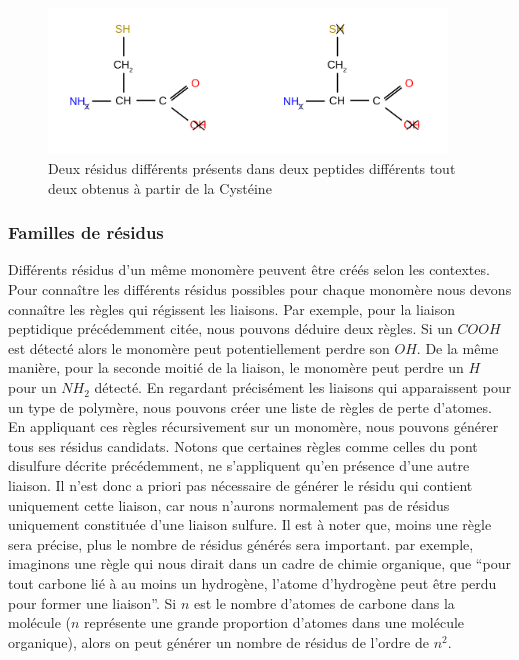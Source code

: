 \begin{figure}[!ht]
  \begin{center}
    \includegraphics[width=400px]{Figures/s2m/residues/cys_exemple.png}
    \caption{\label{cys_ex}Deux résidus différents présents dans deux peptides différents tout deux obtenus à partir de la Cystéine}
  \end{center}
\end{figure}


\subsubsection{Familles de résidus}

Différents résidus d'un même monomère peuvent être créés selon les contextes.
Pour connaître les différents résidus possibles pour chaque monomère nous devons connaître les règles qui régissent les liaisons.
Par exemple, pour la liaison peptidique précédemment citée, nous pouvons déduire deux règles.
Si un $COOH$ est détecté alors le monomère peut potentiellement perdre son $OH$.
De la même manière, pour la seconde moitié de la liaison, le monomère peut perdre un $H$ pour un $NH_2$ détecté.
En regardant précisément les liaisons qui apparaissent pour un type de polymère, nous pouvons créer une liste de règles de perte d'atomes.
En appliquant ces règles récursivement sur un monomère, nous pouvons générer tous ses résidus candidats.
Notons que certaines règles comme celles du pont disulfure décrite précédemment, ne s'appliquent qu'en présence d'une autre liaison.
Il n'est donc a priori pas nécessaire de générer le résidu qui contient uniquement cette liaison, car nous n'aurons normalement pas de résidus uniquement constituée d'une liaison sulfure.
Il est à noter que, moins une règle sera précise, plus le nombre de résidus générés sera important.
par exemple, imaginons une règle qui nous dirait dans un cadre de chimie organique, que ``pour tout carbone lié à au moins un hydrogène, l'atome d'hydrogène peut être perdu pour former une liaison''.
Si $n$ est le nombre d'atomes de carbone dans la molécule ($n$ représente une grande proportion d'atomes dans une molécule organique), alors on peut générer un nombre de résidus de l'ordre de $n^2$.

